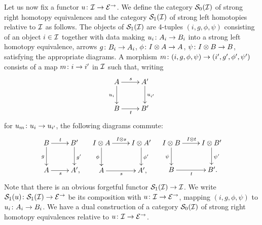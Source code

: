 \documentclass[reqno,10pt,a4paper,oneside,draft]{amsart}
\begin{document}
Let us now fix a functor $u \co \cal{I} \to \catE^\to$.
We define the category $\cal{S}_0(\cal{I})$ of strong right homotopy equivalences and the category $\cal{S}_1(\cal{I})$ of strong left homotopies relative to $\cal{I}$ as follows.
The objects of $\cal{S}_1(\cal{I})$ are 4-tuples $(i, g,\phi,\psi)$ consisting of an object $i \in \cal{I}$ together with data making $u_i \co A_i \to B_i$ into a strong left homotopy equivalence, \ie arrows $g \co B_i \to A_i$, $\phi \co \interval \otimes A \to A$, $\psi \co \interval \otimes B \to B$, satisfying the appropriate diagrams.
A morphism $m \co (i,g, \phi, \psi) \to (i', g', \phi', \psi')$ consists of a map $m \co i \to i'$ in $\cal{I}$ such that, writing
\[
\xymatrix{
  A \ar[d]_{u_i} \ar[r]^s & A' \ar[d]^{u_{i'}} \\
  B \ar[r]_t & B'
}
\]
for $u_m \co u_i \to u_{i'}$, the following diagrams commute:
\begin{align*}
\xymatrix{
  B
  \ar[r]^{t}
  \ar[d]_{g}
&
  B'
  \ar[d]^{g'}
\\
  A
  \ar[r]_{s}
&
  A'\rlap{,}
}
&&
\xymatrix{
  \interval \otimes A
  \ar[d]_{\phi}
  \ar[r]^{\interval \otimes s}
&
  I \otimes A'
  \ar[d]^{\phi'}
\\
  A
  \ar[r]_{s}
&
  A' \rlap{,}
}
&&
\xymatrix{
  \interval \otimes B
  \ar[d]_{\psi}
  \ar[r]^{\interval \otimes t}
&
  I \otimes B'
  \ar[d]^{\psi'}
\\
  B
  \ar[r]_{t}
&
  B' \rlap{.}
}
\end{align*}
Note that there is an obvious forgetful functor $\cal{S}_1(\cal{I}) \to \cal{I}$.
We write $\cal{S}_1(u) \co \cal{S}_1(\cal{I}) \to \catE^\to$ be its composition with $u \co \cal{I} \to \catE^\to$, mapping $(i, g,\phi,\psi)$ to $u_i \co A_i \to B_i$.
We have a dual construction of a category $\cal{S}_0(\cal{I})$ of strong right homotopy equivalences relative to $u \co \cal{I} \to \catE^\to$.
\end{document}
